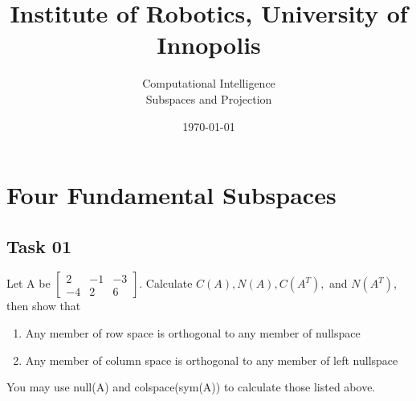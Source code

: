 \documentclass[12pt]{article}%
\begin{document}
\title{Institute of Robotics,  University of Innopolis}
\author{Computational Intelligence \\ Subspaces and Projection}
\date{\today}
\maketitle


\section{Four Fundamental Subspaces}

\subsection{Task 01}

Let A be $\begin{bmatrix}
2 & -1 & -3\\ 
 -4 & 2 & 6
\end{bmatrix}$. Calculate $C(A), N(A), C(A^T),$ and $N(A^T)$, then show that 
\begin{enumerate}
     \item Any member of row space is orthogonal to any member of nullspace
    \item Any member of column space is orthogonal to any member of left nullspace
\end{enumerate}

You may use null(A) and colspace(sym(A)) to calculate those listed above. 

\begin{figure}[h]%
    \centering
{}%
    \qquad
    \label{fig:example}%
\end{figure}
\end{document}
